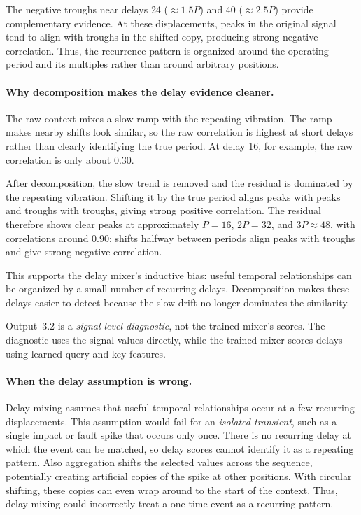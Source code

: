 \documentclass[a4, 12pt]{article}
\begin{document}
The negative troughs near delays 24 ($\approx 1.5P$) and 40
($\approx 2.5P$) provide complementary evidence. At these
displacements, peaks in the original signal tend to align with
troughs in the shifted copy, producing strong negative correlation.
Thus, the recurrence pattern is organized around the operating
period and its multiples rather than around arbitrary positions.

\paragraph{Why decomposition makes the delay evidence cleaner.}
The raw context mixes a slow ramp with the repeating vibration. The ramp makes
nearby shifts look similar, so the raw correlation is highest at short delays
rather than clearly identifying the true period. At delay 16, for example, the
raw correlation is only about $0.30$.

After decomposition, the slow trend is removed and the residual is dominated by
the repeating vibration. Shifting it by the true period aligns peaks with peaks
and troughs with troughs, giving strong positive correlation. The residual
therefore shows clear peaks at approximately $P=16$, $2P=32$, and
$3P\approx48$, with correlations around $0.90$; shifts halfway between periods
align peaks with troughs and give strong negative correlation.

This supports the delay mixer's inductive bias: useful temporal relationships
can be organized by a small number of recurring delays. Decomposition makes
these delays easier to detect because the slow drift no longer dominates the
similarity.

Output~3.2 is a \emph{signal-level diagnostic}, not the trained mixer's scores.
The diagnostic uses the signal values directly, while the trained mixer scores
delays using learned query and key features.


\paragraph{When the delay assumption is wrong.}
Delay mixing assumes that useful temporal relationships occur at a few recurring
displacements. This assumption would fail for an \emph{isolated transient}, such
as a single impact or fault spike that occurs only once. There is no recurring
delay at which the event can be matched, so delay scores cannot identify it as a
repeating pattern. Also aggregation shifts the selected values across the
sequence, potentially creating artificial copies of the spike at other
positions. With circular shifting, these copies can even wrap around to the
start of the context. Thus, delay mixing could incorrectly treat a one-time
event as a recurring pattern.
\end{document}
